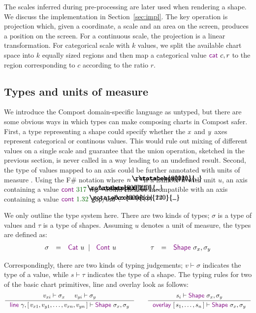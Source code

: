 \documentclass{jfp}
\newcommand{\X}{\emph{x}\ }
\newcommand{\Y}{\emph{y}\ }
\newcommand{\lsep}{\;\;|\;\;}
\newcommand{\num}[1]{\textcolor{numclr}{#1}}
\newcommand{\ident}[1]{\textnormal{\textcolor{idclr}{\sffamily #1}}}
\newcommand{\kvd}[1]{\textnormal{\textcolor{kvdclr}{\sffamily #1}}}
\newcommand{\langl}{\begin{picture}(4.5,7)
\put(1.1,2.5){\rotatebox{60}{\line(1,0){5.5}}}
\put(1.1,2.5){\rotatebox{300}{\line(1,0){5.5}}}
\end{picture}}
\newcommand{\rangl}{\begin{picture}(4.5,7)
\put(.9,2.5){\rotatebox{120}{\line(1,0){5.5}}}
\put(.9,2.5){\rotatebox{240}{\line(1,0){5.5}}}
\end{picture}}
\begin{document}
The scales inferred during pre-processing are later used when rendering a shape.
We discuss the implementation in Section~\ref{sec:impl}. The key operation is projection
which, given a coordinate, a scale and an area on the screen, produces a position on
the screen. For a continuous scale, the projection is a linear transformation. For
categorical scale with $k$ values, we split the available chart space into $k$ equally sized
regions and then map a categorical value $\kvd{cat}~c, r$ to the region corresponding to $c$
according to the ratio $r$.

\subsection{Types and units of measure}
\label{sec:basic-types}

We introduce the Compost domain-specific language as untyped, but there are some obvious ways in
which types can make composing charts in Compost safer. First, a type representing a shape could
specify whether the \X and \Y axes represent categorical or continous values. This would rule out
mixing of different values on a single scale and guarantee that the \ident{union} operation,
sketched in the previous section, is never called in a way leading to an undefined result.
Second, the type of values mapped to an axis could be further annotated with units of measure
\cite{units}. Using the F\# notation where $n\langl u\rangl$ is a number $n$ with unit $u$,
an axis containing a value $\kvd{cont}~\num{317}\langl \ident{mp}\rangl$ would then be incompatible
with an axis containing a value $\kvd{cont}~\num{1.32}\langl \ident{gbp}/\ident{usd}\rangl$.

We only outline the type system here. There are two kinds of types; $\sigma$ is a type of values
and $\tau$ is a type of shapes. Assuming $u$ denotes a unit of measure, the types are defined as:
%
\begin{equation*}
\begin{array}{rcl}
\sigma & = & \kvd{Cat}~u \lsep \kvd{Cont}~u
\end{array}
\qquad\qquad
\begin{array}{rcl}
\tau & = & \kvd{Shape}~\sigma_x, \sigma_y \\
\end{array}
\end{equation*}

\vspace{-1.25em}
\noindent
Correspondingly, there are two kinds of typing judgements; $v\vdash \sigma$ indicates the type of a
value, while $s\vdash \tau$ indicates the type of a shape. The typing rules for two of the
basic chart primitives, \kvd{line} and \kvd{overlay} look as follows:
%
\begin{equation*}
\inference
  {v_{xi} \vdash \sigma_x & v_{yi} \vdash \sigma_y}
  {\kvd{line}~\gamma, [\,v_{x1}, v_{y1}, \ldots, v_{xn}, v_{yn}\,] \vdash \kvd{Shape}~\sigma_x, \sigma_y}
\qquad
\inference
  {s_i \vdash \kvd{Shape}~\sigma_x, \sigma_y}
  {\kvd{overlay}~[\,s_1, \ldots, s_n\,] \vdash \kvd{Shape}~\sigma_x, \sigma_y}
\end{equation*}
\end{document}
